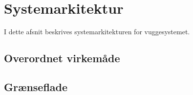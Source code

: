 \section{Systemarkitektur}

I dette afsnit beskrives systemarkitekturen for vuggesystemet.

\subsection*{Overordnet virkemåde}

\subsection*{Grænseflade}